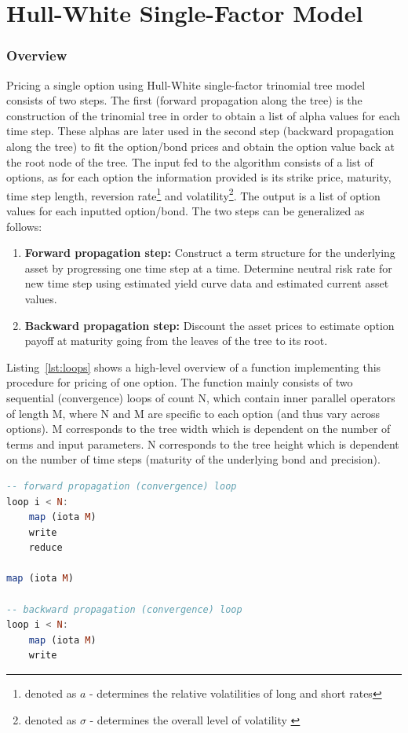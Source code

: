 \chapter{Hull-White Single-Factor Model}
\label{chapter:hullwhitemodel}

\subsection{Overview}
Pricing a single option using Hull-White single-factor trinomial tree model consists of two steps. The first (forward propagation along the tree) is the construction of the trinomial tree in order to obtain a list of alpha values for each time step. These alphas are later used in the second step (backward propagation along the tree) to fit the option/bond prices and obtain the option value back at the root node of the tree. The input fed to the algorithm consists of a list of options, as for each option the information provided is its strike price, maturity, time step length, reversion rate\footnote{denoted as $a$ - determines the relative volatilities of long and short rates\cite[pg.9]{npfits}} and volatility\footnote{denoted as $\sigma$ - determines the overall level of volatility \cite[pg. 9]{npfits}}. The output is a list of option values for each inputted option/bond. The two steps can be generalized as follows: 

\begin{enumerate}
    \item \textbf{Forward propagation step:} Construct a term structure for the underlying asset by progressing one time step at a time. Determine neutral risk rate for new time step using estimated yield curve data and estimated current asset values.
    \item \textbf{Backward propagation step:} Discount the asset prices to estimate option payoff at maturity going from the leaves of the tree to its root. 
\end{enumerate}

Listing~\ref{lst:loops} shows a high-level overview of a function implementing this procedure for pricing of one option. The function mainly consists of two sequential (convergence) loops of count N, which contain inner parallel operators of length M, where N and M are specific to each option (and thus vary across options). M corresponds to the tree width which is dependent on the number of terms and input parameters. N corresponds to the tree height which is dependent on the number of time steps (maturity of the underlying bond and precision).
\clearpage
\begin{lstlisting}[caption={High-level overview of pricing a single option using Hull-White 1F model},label={lst:loops},language=Haskell,frame=lines]
-- forward propagation (convergence) loop
loop i < N:
    map (iota M)
    write
    reduce

map (iota M)

-- backward propagation (convergence) loop
loop i < N:
    map (iota M)
    write
\end{lstlisting}

